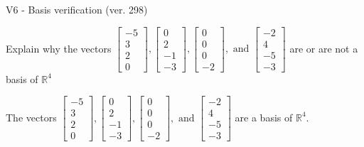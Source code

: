 \begin{exercise}
  \begin{exerciseTitle}V6 - Basis verification (ver. 298)\end{exerciseTitle}
  \begin{exerciseStatement}
    Explain why the vectors \(\left[\begin{array}{r}
-5 \\
3 \\
2 \\
0
\end{array}\right] , \left[\begin{array}{r}
0 \\
2 \\
-1 \\
-3
\end{array}\right] , \left[\begin{array}{r}
0 \\
0 \\
0 \\
-2
\end{array}\right] , \text{ and } \left[\begin{array}{r}
-2 \\
4 \\
-5 \\
-3
\end{array}\right]\) are or are not a basis of \(\mathbb{R}^4\)	


  \end{exerciseStatement}
  \begin{exerciseAnswer}
   The vectors \(\left[\begin{array}{r}
-5 \\
3 \\
2 \\
0
\end{array}\right] , \left[\begin{array}{r}
0 \\
2 \\
-1 \\
-3
\end{array}\right] , \left[\begin{array}{r}
0 \\
0 \\
0 \\
-2
\end{array}\right] , \text{ and } \left[\begin{array}{r}
-2 \\
4 \\
-5 \\
-3
\end{array}\right]\) 
  	 are  a basis of \(\mathbb{R}^4\).
  


  \end{exerciseAnswer}
\end{exercise}